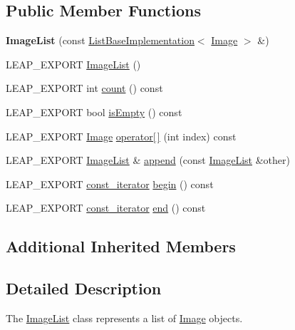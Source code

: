 \subsection*{Public Member Functions}
\begin{DoxyCompactItemize}
\item 
\mbox{\label{class_leap_1_1_image_list_ab47e93e917deecc9bbba3086bff2968d}} 
{\bfseries Image\+List} (const \hyperlink{class_leap_1_1_list_base_implementation}{List\+Base\+Implementation}$<$ \hyperlink{class_leap_1_1_image}{Image} $>$ \&)
\item 
L\+E\+A\+P\+\_\+\+E\+X\+P\+O\+RT \hyperlink{class_leap_1_1_image_list_a16614e13ece92455a024fd2409462753}{Image\+List} ()
\item 
L\+E\+A\+P\+\_\+\+E\+X\+P\+O\+RT int \hyperlink{class_leap_1_1_image_list_ab529e2c3b3381d1195c98379828dce7c}{count} () const
\item 
L\+E\+A\+P\+\_\+\+E\+X\+P\+O\+RT bool \hyperlink{class_leap_1_1_image_list_a0dd50c8397d6e927c6e80fa5f197b1b3}{is\+Empty} () const
\item 
L\+E\+A\+P\+\_\+\+E\+X\+P\+O\+RT \hyperlink{class_leap_1_1_image}{Image} \hyperlink{class_leap_1_1_image_list_af1b9a66c27379ec4fd6b7bc0e5936b51}{operator\mbox{[}$\,$\mbox{]}} (int index) const
\item 
L\+E\+A\+P\+\_\+\+E\+X\+P\+O\+RT \hyperlink{class_leap_1_1_image_list}{Image\+List} \& \hyperlink{class_leap_1_1_image_list_abb73a8ec8bf55019accfd092029e4513}{append} (const \hyperlink{class_leap_1_1_image_list}{Image\+List} \&other)
\item 
L\+E\+A\+P\+\_\+\+E\+X\+P\+O\+RT \hyperlink{class_leap_1_1_image_list_ae3c17a6b8ac23853649ba93abd5a1dbe}{const\+\_\+iterator} \hyperlink{class_leap_1_1_image_list_a2cb2ff33ca9f5adbb33adc9064decf34}{begin} () const
\item 
L\+E\+A\+P\+\_\+\+E\+X\+P\+O\+RT \hyperlink{class_leap_1_1_image_list_ae3c17a6b8ac23853649ba93abd5a1dbe}{const\+\_\+iterator} \hyperlink{class_leap_1_1_image_list_ae4dac1f27bbc44e654998366c2cb5ff2}{end} () const
\end{DoxyCompactItemize}
\subsection*{Additional Inherited Members}


\subsection{Detailed Description}
The \hyperlink{class_leap_1_1_image_list}{Image\+List} class represents a list of \hyperlink{class_leap_1_1_image}{Image} objects.

